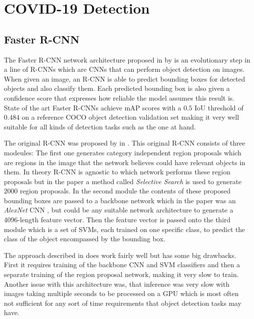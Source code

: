 \chapter{COVID-19 Detection}\label{chapter:detection}


\section{Faster R-CNN}

The Faster R-CNN network architecture proposed in \autocite{ren_faster_2016} by \citeauthor{ren_faster_2016} is an evolutionary step in a line of \acp{R-CNN} which are \acp{CNN} that can perform object detection on images. When given an image, an \ac{R-CNN} is able to predict bounding boxes for detected objects and also classify them. Each predicted bounding box is also given a confidence score that expresses how reliable the model assumes this result is. State of the art Faster \acp{R-CNN} achieve \ac{mAP} scores with a $0.5$ \ac{IoU} threshold of $0.484$ on a reference COCO object detection validation set making it very well suitable for all kinds of detection tasks such as the one at hand. 

The original \ac{R-CNN} was proposed by \citeauthor{girshick_rich_2014} in \autocite{girshick_rich_2014}. This original \ac{R-CNN} consists of three modeules: The first one generates category independent region proposals which are regions in the image that the network believes could have relevant objects in them. In theory \ac{R-CNN} is agnostic to which network performs these region proposals but in the paper a method called \textit{Selective Search} \autocite{uijlings_selective_2013} is used to generate $2000$ region proposals. In the second module the contents of these proposed bounding boxes are passed to a backbone network which in the paper was an \textit{AlexNet} CNN \autocite{krizhevsky_imagenet_2017}, but could be any suitable network architecture to generate a 4096-length feature vector. Then the feature vector is passed onto the third module which is a set of \acp{SVM}, each trained on one specific class, to predict the class of the object encompassed by the bounding box.

The approach described in \autocite{girshick_rich_2014} does work fairly well but has some big drawbacks. First it requires training of the backbone CNN and \ac{SVM} classifiers and then a separate training of the region proposal network, making it very slow to train. Another issue with this architecture was, that inference was very slow with images taking multiple seconds to be processed on a GPU which is most often not sufficient for any sort of time requirements that object detection tasks may have.

